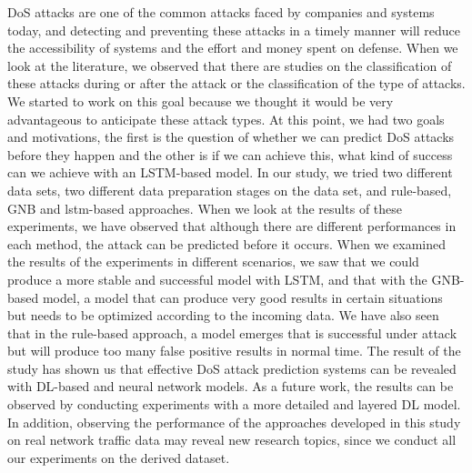 \documentclass{article}
\begin{document}
DoS attacks are one of the common attacks faced by companies and systems today, and detecting and preventing these attacks in a timely manner will reduce the accessibility of systems and the effort and money spent on defense. When we look at the literature, we observed that there are studies on the classification of these attacks during or after the attack or the classification of the type of attacks. We started to work on this goal because we thought it would be very advantageous to anticipate these attack types. At this point, we had two goals and motivations, the first is the question of whether we can predict DoS attacks before they happen and the other is if we can achieve this, what kind of success can we achieve with an LSTM-based model. In our study, we tried two different data sets, two different data preparation stages on the data set, and rule-based, GNB and lstm-based approaches. When we look at the results of these experiments, we have observed that although there are different performances in each method, the attack can be predicted before it occurs. When we examined the results of the experiments in different scenarios, we saw that we could produce a more stable and successful model with LSTM, and that with the GNB-based model, a model that can produce very good results in certain situations but needs to be optimized according to the incoming data. We have also seen that in the rule-based approach, a model emerges that is successful under attack but will produce too many false positive results in normal time. The result of the study has shown us that effective DoS attack prediction systems can be revealed with DL-based and neural network models. As a future work, the results can be observed by conducting experiments with a more detailed and layered DL model. In addition, observing the performance of the approaches developed in this study on real network traffic data may reveal new research topics, since we conduct all our experiments on the derived dataset.



\end{document}
